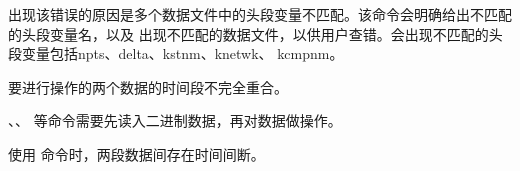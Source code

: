出现该错误的原因是多个数据文件中的头段变量不匹配。该命令会明确给出不匹配的头段变量名，以及
出现不匹配的数据文件，以供用户查错。会出现不匹配的头段变量包括npts、delta、kstnm、knetwk、
kcmpnm。

要进行操作的两个数据的时间段不完全重合。

、、 等命令需要先读入二进制数据，再对数据做操作。

使用  命令时，两段数据间存在时间间断。
